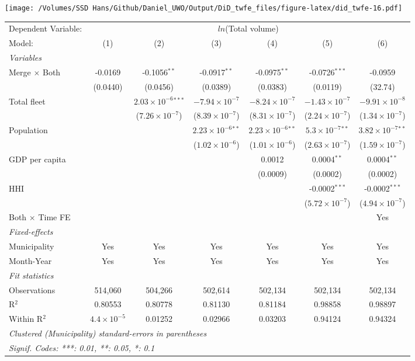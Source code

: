 \documentclass[
]{article}
\begin{document}
\texttt{[image: /Volumes/SSD Hans/Github/Daniel\_UWO/Output/DiD\_twfe\_files/figure-latex/did\_twfe-16.pdf]}

\begin{tabular}{lcccccc}
\tabularnewline\midrule\midrule
Dependent Variable:&\multicolumn{6}{c}{$ln$(Total volume)}\\
Model:&(1) & (2) & (3) & (4) & (5) & (6)\\
\midrule \emph{Variables}&   &   &   &   &   &  \\
Merge $\times $ Both & -0.0169 & -0.1056$^{**}$ & -0.0917$^{**}$ & -0.0975$^{**}$ & -0.0726$^{***}$ & -0.0959\\
  &(0.0440) & (0.0456) & (0.0389) & (0.0383) & (0.0119) & (32.74)\\
Total fleet &    & $2.03\times 10^{-6}$$^{***}$ & $-7.94\times 10^{-7}$ & $-8.24\times 10^{-7}$ & $-1.43\times 10^{-7}$ & $-9.91\times 10^{-8}$\\
  &   & ($7.26\times 10^{-7}$) & ($8.39\times 10^{-7}$) & ($8.31\times 10^{-7}$) & ($2.24\times 10^{-7}$) & ($1.34\times 10^{-7}$)\\
Population &    &    & $2.23\times 10^{-6}$$^{**}$ & $2.23\times 10^{-6}$$^{**}$ & $5.3\times 10^{-7}$$^{**}$ & $3.82\times 10^{-7}$$^{**}$\\
  &   &    & ($1.02\times 10^{-6}$) & ($1.01\times 10^{-6}$) & ($2.63\times 10^{-7}$) & ($1.59\times 10^{-7}$)\\
GDP per capita &    &    &    & 0.0012 & 0.0004$^{**}$ & 0.0004$^{**}$\\
  &   &    &    & (0.0009) & (0.0002) & (0.0002)\\
HHI &    &    &    &    & -0.0002$^{***}$ & -0.0002$^{***}$\\
  &   &    &    &    & ($5.72\times 10^{-7}$) & ($4.94\times 10^{-7}$)\\
Both $\times$ Time FE &  &  &  &  &  & Yes\\
\midrule \emph{Fixed-effects}&   &   &   &   &   &  \\
Municipality & Yes & Yes & Yes & Yes & Yes & Yes\\
Month-Year & Yes & Yes & Yes & Yes & Yes & Yes\\
\midrule \emph{Fit statistics}&  & & & & & \\
Observations & 514,060&504,266&502,614&502,134&502,134&502,134\\
R$^2$ & 0.80553&0.80778&0.81130&0.81184&0.98858&0.98897\\
Within R$^2$ & $4.4\times 10^{-5}$&0.01252&0.02966&0.03203&0.94124&0.94324\\
\midrule\midrule\multicolumn{7}{l}{\emph{Clustered (Municipality) standard-errors in parentheses}}\\
\multicolumn{7}{l}{\emph{Signif. Codes: ***: 0.01, **: 0.05, *: 0.1}}\\
\end{tabular}
\end{document}
